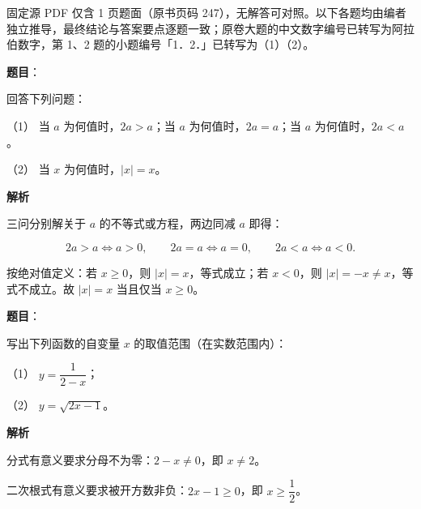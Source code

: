

\begin{gktip}
固定源 PDF 仅含 1 页题面（原书页码 247），无解答可对照。以下各题均由编者独立推导，最终结论与答案要点逐题一致；原卷大题的中文数字编号已转写为阿拉伯数字，第 1、2 题的小题编号「1．2．」已转写为（1）（2）。
\end{gktip}

\begin{answer}

\textbf{题目}：

回答下列问题：

（1） 当 $a$ 为何值时，$2a>a$；当 $a$ 为何值时，$2a=a$；当 $a$ 为何值时，$2a<a$。

（2） 当 $x$ 为何值时，$|x|=x$。

\textbf{解析}


三问分别解关于 $a$ 的不等式或方程，两边同减 $a$ 即得：

\nopagebreak[4]
\[
2a>a\iff a>0,\qquad
2a=a\iff a=0,\qquad
2a<a\iff a<0.
\]


按绝对值定义：若 $x\ge0$，则 $|x|=x$，等式成立；若 $x<0$，则 $|x|=-x\ne x$，等式不成立。故 $|x|=x$ 当且仅当 $x\ge0$。



\end{answer}
\begin{answer}

\textbf{题目}：

写出下列函数的自变量 $x$ 的取值范围（在实数范围内）：

（1） $y=\dfrac{1}{2-x}$；

（2） $y=\sqrt{2x-1}$。

\textbf{解析}


分式有意义要求分母不为零：$2-x\ne0$，即 $x\ne2$。


二次根式有意义要求被开方数非负：$2x-1\ge0$，即 $x\ge\dfrac{1}{2}$。



\end{answer}
